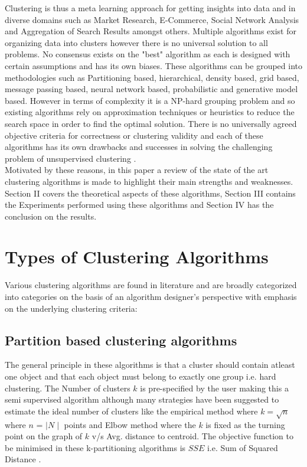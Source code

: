 Clustering is thus a meta learning approach for getting insights into data and in diverse domains such as Market Research, E-Commerce, Social Network Analysis and Aggregation of Search Results amongst others. Multiple algorithms exist for organizing data into clusters however there is no universal solution to all problems. No consensus exists on the "best" algorithm as each is designed with certain assumptions and has its own biases. These algorithms can be grouped into methodologies such as Partitioning based, hierarchical, density based, grid based, message passing based, neural network based, probabilistic and generative model based. However in terms of complexity it is a NP-hard grouping problem and so existing algorithms rely on approximation techniques or heuristics to reduce the search space in order to find the optimal solution. There is no universally agreed objective criteria for correctness or clustering validity and each of these algorithms has its own drawbacks and successes in solving the challenging problem of unsupervised clustering \cite{aps:5} \cite{aps:4} . \\

Motivated by these reasons, in this paper a review of the state of the art clustering algorithms is made to highlight their main strengths and weaknesses. Section II covers the theoretical aspects of these algorithms, Section III contains the Experiments performed using these algorithms and Section IV has the conclusion on the results. 


\section{Types of Clustering Algorithms}

Various clustering algorithms are found in literature \cite{aps:2} \cite{aps:7} \cite{aps:3} \cite{aps:4} and are broadly categorized into categories on the basis of an algorithm designer's perspective with emphasis on the underlying clustering criteria:

\subsection{Partition based clustering algorithms}
 
The general principle in these algorithms is that a cluster should contain atleast one object and that each object must belong to exactly one group i.e. hard clustering. The Number of clusters $k$ is pre-specified by the user making this a semi supervised algorithm although many strategies have been suggested to estimate the ideal number of clusters like the empirical method where $k=\sqrt{n}$ where $ n$ = $\mid N \mid$ points and Elbow method where the $k$ is fixed as the turning point on the graph of $k$ v/s Avg. distance to centroid. The objective function to be minimised in these k-partitioning algorithms is $SSE$ i.e. Sum of Squared Distance \cite{aps:37}.


